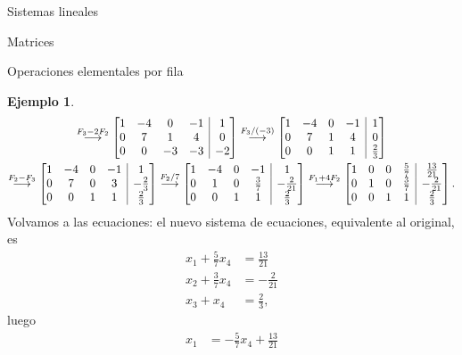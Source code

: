 \documentclass[a4paper,12pt,twoside,spanish,reqno]{amsbook}
\theoremstyle{definition}
\newtheorem{ejemplo}{Ejemplo}[section]
\theoremstyle{remark}
\begin{document}
\begin{chapter}{Sistemas lineales}
\begin{section}{Matrices}
\begin{subsection}{Operaciones elementales por fila}
\begin{ejemplo}
\begin{multline*}
                    \stackrel{F_3-2 F_2}{\longrightarrow} 
                    \left[\begin{array}{@{}*{4}{c}|c@{}}  1&-4 &0&-1&1 \\ 0& 7&1& 4&0 \\ 0&0&-3&-3&-2 \end{array}\right] 
                    \stackrel{F_3/(-3)}{\longrightarrow} 
                    \left[\begin{array}{@{}*{4}{c}|c@{}}  1&-4 &0&-1&1 \\ 0& 7&1& 4&0 \\ 0&0&1&1&\frac{2}{3} \end{array}\right]
                    \\
                    \stackrel{F_2- F_3}{\longrightarrow} 
                    \left[\begin{array}{@{}*{4}{c}|c@{}}  1&-4 &0&-1&1 \\ 0& 7&0& 3&-\frac{2}{3} \\ 0&0&1&1&\frac{2}{3} \end{array}\right]
                    \stackrel{F_2/7}{\longrightarrow} 
                    \left[\begin{array}{@{}*{4}{c}|c@{}}  1&-4 &0&-1&1\\ 0& 1&0& \frac37&-\frac{2}{21}\\ 0&0&1&1&\frac{2}{3}\end{array}\right]
                    \stackrel{F_1 +4F_2}{\longrightarrow} 
                    \left[\begin{array}{@{}*{4}{c}|c@{}} 1&0&0&\frac{5}{7}&\frac{13}{21}\\0&1&0&\frac37&-\frac{2}{21} \\ 0&0&1&1&\frac{2}{3}\end{array}\right].
                    \end{multline*}
                    Volvamos a las ecuaciones: el nuevo sistema de ecuaciones, equivalente al original, es
                    \begin{align*}
                    x_1 +\frac{5}{7}x_4 &= \frac{13}{21} \\
                    x_2 + \frac{3}{7}x_4 &=-\frac{2}{21} \\
                    x_3 +x_4 &= \frac{2}{3}, 
                    \end{align*}
                    luego 
                    \begin{align*}
                    x_1  &=-\frac{5}{7}x_4 + \frac{13}{21}\\

\end{align*}
\end{ejemplo}
\end{subsection}
\end{section}
\end{chapter}
\end{document}
